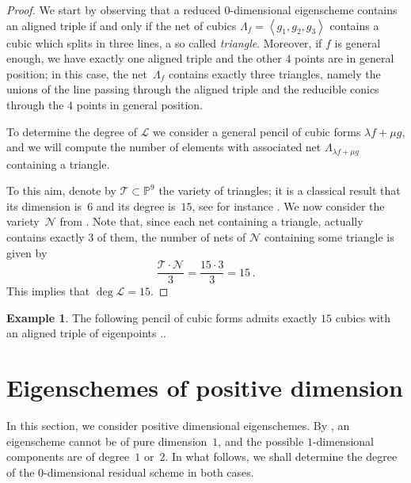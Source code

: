 \documentclass{amsart}
\theoremstyle{plain}
\theoremstyle{definition}
\newtheorem{es}[lemma]{Example}
\newcommand{\p}{\mathbb{P}}
\begin{document}
\begin{proof}
We start by observing that a reduced $0$-dimensional eigenscheme contains an aligned triple if and only if the net of cubics
$\Lambda_f = \left\langle g_1, g_2, g_3 \right\rangle$ contains a cubic which splits in three lines, a so called \emph{triangle}. Moreover, if $f$ is general enough, we have exactly one aligned triple and the other $4$ points are in general position; in this case, the net~$\Lambda_f$ contains exactly three triangles, namely the unions of the line passing through the aligned triple and the reducible conics through the $4$ points in general position.

To determine the degree of $\mathcal{L}$ we consider a general pencil of cubic forms $\lambda f + \mu g$, and we will compute the number of elements with associated net $\Lambda_{\lambda f + \mu g}$ containing a triangle.

To this aim, denote by ${\mathcal T} \subset \p^9$ the variety of triangles; it is a classical result that its dimension is~$6$ and its degree is~$15$,
see for instance \cite[Section~2.2.2]{3264}. We now consider the variety~$\mathcal{N}$ from .
Note that, since each net containing a triangle, actually contains exactly $3$ of them, the number of nets of $\mathcal{N}$ containing some triangle is given by
%
\[
 \frac{\mathcal{T} \cdot \mathcal{N}}{3} = \frac{{15} \cdot {3}}{3} = 15 \,.
\]
%
This implies that $\deg \mathcal{L} = 15$.
\end{proof}

\begin{es}
The following pencil of cubic forms admits exactly $15$ cubics with an aligned triple of eigenpoints ..
\end{es}


\section{Eigenschemes of positive dimension}
\label{positive_dim}

In this section, we consider positive dimensional eigenschemes.
By \cite{BGV}, an eigenscheme cannot be of pure dimension~$1$, and the possible $1$-dimensional components are of degree~$1$ or~$2$.
In what follows, we shall determine the degree of the $0$-dimensional residual scheme in both cases.
\end{document}

